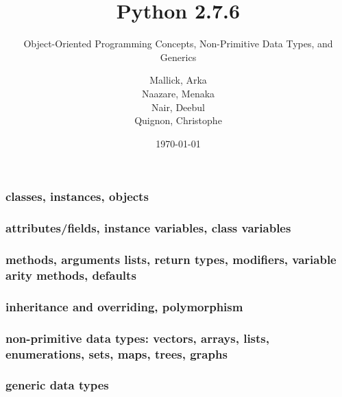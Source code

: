 \documentclass{beamer}
\begin{document}
\title{Python 2.7.6}
\subtitle{Object-Oriented Programming Concepts, Non-Primitive Data Types, and Generics}
\author{
  Mallick, Arka\\
  Naazare, Menaka \\
  Nair, Deebul\\
  Quignon, Christophe \\
} 
\date{\today}

\begin{frame}
\titlepage
\end{frame}

\begin{frame}[fragile]
\frametitle{classes, instances, objects}
\framesubtitle{}

\end{frame}

\begin{frame}[fragile]
\frametitle{attributes/fields, instance variables, class variables}
\framesubtitle{}

\end{frame}

\begin{frame}[fragile]
\frametitle{methods, arguments lists, return types, modifiers, variable arity methods, defaults}
\framesubtitle{}

\end{frame}

\begin{frame}[fragile]
\frametitle{inheritance and overriding, polymorphism}
\framesubtitle{}

\end{frame}

\begin{frame}[fragile]
\frametitle{non-primitive data types: vectors, arrays, lists, enumerations, sets, maps, trees, graphs}
\framesubtitle{}

\end{frame}

\begin{frame}[fragile]
\frametitle{generic data types}
\framesubtitle{}

\end{frame}

\end{document}
